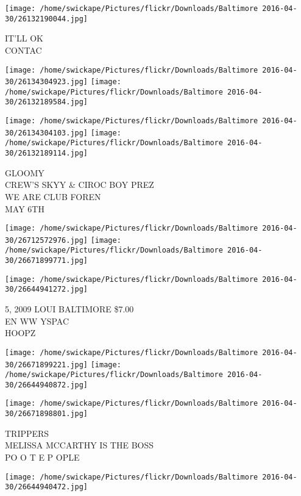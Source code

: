 \documentclass[10pt,letterpaper]{article}
\begin{document}
\vspace{0.25in}
\texttt{[image: /home/swickape/Pictures/flickr/Downloads/Baltimore 2016-04-30/26132190044.jpg]}

IT'LL OK\\
CONTAC\\
\pagebreak

\texttt{[image: /home/swickape/Pictures/flickr/Downloads/Baltimore 2016-04-30/26134304923.jpg]}
\texttt{[image: /home/swickape/Pictures/flickr/Downloads/Baltimore 2016-04-30/26132189584.jpg]}

\texttt{[image: /home/swickape/Pictures/flickr/Downloads/Baltimore 2016-04-30/26134304103.jpg]}
\texttt{[image: /home/swickape/Pictures/flickr/Downloads/Baltimore 2016-04-30/26132189114.jpg]}

GLOOMY\\
CREW'S SKYY \& CIROC BOY PREZ\\
WE ARE CLUB FOREN\\
MAY 6TH\\
\pagebreak

\texttt{[image: /home/swickape/Pictures/flickr/Downloads/Baltimore 2016-04-30/26712572976.jpg]}
\texttt{[image: /home/swickape/Pictures/flickr/Downloads/Baltimore 2016-04-30/26671899771.jpg]}

\vspace{0.25in}
\texttt{[image: /home/swickape/Pictures/flickr/Downloads/Baltimore 2016-04-30/26644941272.jpg]}

5, 2009 LOUI BALTIMORE \$7.00\\
EN WW YSPAC\\
HOOPZ\\
\pagebreak

\texttt{[image: /home/swickape/Pictures/flickr/Downloads/Baltimore 2016-04-30/26671899221.jpg]}
\texttt{[image: /home/swickape/Pictures/flickr/Downloads/Baltimore 2016-04-30/26644940872.jpg]}

\vspace{0.25in}
\texttt{[image: /home/swickape/Pictures/flickr/Downloads/Baltimore 2016-04-30/26671898801.jpg]}

TRIPPERS\\
MELISSA MCCARTHY IS THE BOSS\\
PO O T E P OPLE\\
\pagebreak

\texttt{[image: /home/swickape/Pictures/flickr/Downloads/Baltimore 2016-04-30/26644940472.jpg]}
\end{document}
